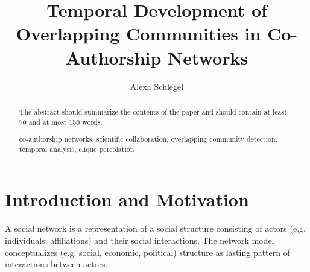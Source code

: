 \documentclass[runningheads,a4paper]{llncs}
\newcommand{\keywords}[1]{\par\addvspace\baselineskip
\noindent\keywordname\enspace\ignorespaces#1}
\begin{document}
\mainmatter  %

\title{Temporal Development of Overlapping Communities in Co-Authorship Networks}


%
%
\author{Alexa Schlegel%
}
%


%
%

\maketitle


\begin{abstract}
The abstract should summarize the contents of the paper and should
contain at least 70 and at most 150 words.
\keywords{co-authorship networks, scientific collaboration, overlapping community detection, temporal analysis, clique percolation}
\end{abstract}

\section{Introduction and Motivation}
A social network is a representation of a social structure consisting of actors (e.g. individuals, affiliations) and their social interactions.
The network model conceptualizes (e.g. social, economic, political) structure as lasting pattern of interactions between actors.~\cite{wasserman1994social}
\end{document}
